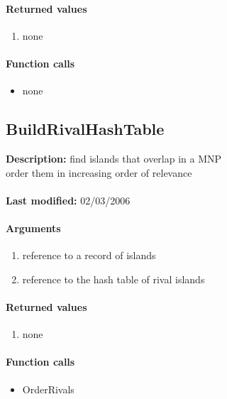 \paragraph{Returned values}
\begin{enumerate}
\item none
\end{enumerate}

\paragraph{Function calls}
\begin{itemize}
\item none
\end{itemize}

\subsection{BuildRivalHashTable}
\textbf{Description:} find islands that overlap in a MNP\\
order them in increasing order of relevance\\
\\\textbf{Last modified:} 02/03/2006

\paragraph{Arguments}
\begin{enumerate}
\item reference to a record of islands
\item reference to the hash table of rival islands
\end{enumerate}

\paragraph{Returned values}
\begin{enumerate}
\item none
\end{enumerate}

\paragraph{Function calls}
\begin{itemize}
\item OrderRivals
\end{itemize}

